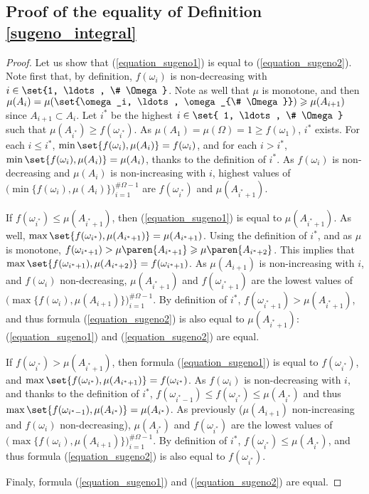 \subsection{Proof of the equality of Definition \ref{sugeno_integral}}
\label{sugeno_integral_RETURN}
\begin{proof}
Let us show that (\ref{equation_sugeno1}) is equal to (\ref{equation_sugeno2}).
Note first that, by definition, $f(\omega_i)$ is non-decreasing with $i \in \set{1, \ldots, \# \Omega}$.
Note as well that $\mu$ is monotone, and then $\mu(A_i) = \mu( \set{\omega_i, \ldots, \omega_{\# \Omega}} ) \geqslant \mu(A_{i+1})$
since $A_{i+1} \subset A_i$.
Let $i^*$ be the highest $i \in \set{ 1, \ldots, \# \Omega }$ such that $\mu(A_{i^*}) \geqslant f(\omega_{i^*})$.
As $\mu(A_1) = \mu(\Omega) = 1 \geqslant f(\omega_1)$, $i^*$ exists. 
For each $i \leqslant i^*$, $\min \set{ f(\omega_i), \mu(A_i) } = f(\omega_i)$,
and for each $i > i^*$, $\min \set{ f(\omega_i), \mu(A_i) } = \mu(A_i)$,
thanks to the definition of $i^*$.
As $f(\omega_i)$ is non-decreasing and $\mu(A_i)$ is non-increasing with $i$,
highest values of $\Big( \displaystyle \min \big\{ f(\omega_i), \mu(A_i) \big\} \Big)_{i=1}^{\# \Omega-1}$
are $f(\omega_{i^*})$ and $\mu(A_{i^*+1})$.

If $f(\omega_{i^*}) \leqslant \mu(A_{i^*+1})$, then
 (\ref{equation_sugeno1}) is equal to $\mu(A_{i^*+1})$.
As well, $\max \set{f(\omega_{i^*}), \mu(A_{i^*+1})} = \mu(A_{i^*+1})$.
Using the definition of $i^*$, and as $\mu$ is monotone, 
$f(\omega_{i^*+1}) > \mu \paren{ A_{i^*+1}} \geqslant \mu \paren{ A_{i^*+2} }$.
This implies that $\max \set{f(\omega_{i^*+1}), \mu(A_{i^*+2})} = f(\omega_{i^*+1})$.
As $\mu(A_{i+1})$ is non-increasing with $i$, and $f(\omega_i)$ non-decreasing,
$\mu(A_{i^*+1})$ and $f(\omega_{i^*+1})$ are the lowest values of 
$\Big( \displaystyle \max \big\{ f(\omega_i), \mu(A_{i+1}) \big\} \Big)_{i=1}^{\# \Omega-1}$.
By definition of $i^*$, $f(\omega_{i^*+1})>\mu(A_{i^*+1})$, 
and thus formula (\ref{equation_sugeno2})
is also equal to $\mu(A_{i^*+1})$: (\ref{equation_sugeno1}) and (\ref{equation_sugeno2}) are equal.

If $f(\omega_{i^*}) > \mu(A_{i^*+1})$,
then formula (\ref{equation_sugeno1}) is equal to $f(\omega_{i^*})$,
and $\max \set{ f(\omega_{i^*}), \mu(A_{i^*+1}) } = f(\omega_{i^*})$.
As $f(\omega_i)$ is non-decreasing with $i$, and thanks to the definition of $i^*$,
$f(\omega_{i^*-1}) \leqslant f(\omega_{i^*}) \leqslant \mu(A_{i^*})$
and thus $\max \set{ f(\omega_{i^*-1}), \mu(A_{i^*}) } = \mu(A_{i^*})$.
As previously ($\mu(A_{i+1})$ non-increasing and $f(\omega_i)$ non-decreasing),
$\mu(A_{i^*})$ and $f(\omega_{i^*})$ are the lowest values of 
$\Big( \displaystyle \max \big\{ f(\omega_i), \mu(A_{i+1}) \big\} \Big)_{i=1}^{\# \Omega-1}$.
By definition of $i^*$, $f(\omega_{i^*})\leqslant\mu(A_{i^*})$, 
and thus formula (\ref{equation_sugeno2})
is also equal to $f(\omega_{i^*})$. 

Finaly, formula (\ref{equation_sugeno1}) and (\ref{equation_sugeno2}) are equal.
\end{proof}









